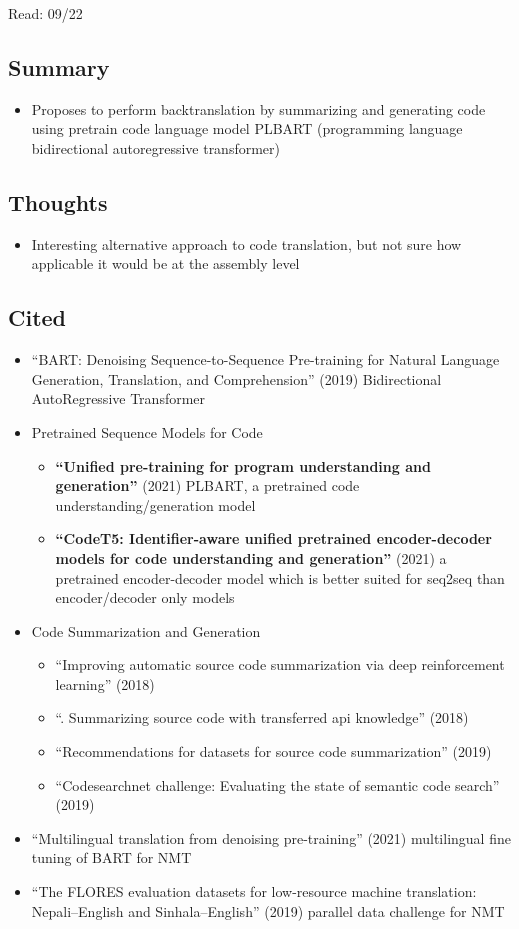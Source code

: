 \documentclass{article}
\begin{document}
\noindent Read: 09/22

\subsection*{Summary}
\begin{itemize}
	\item Proposes to perform backtranslation by summarizing and generating code using pretrain code language model PLBART (programming language bidirectional autoregressive transformer)
\end{itemize}

\subsection*{Thoughts}
\begin{itemize}
	\item Interesting alternative approach to code translation, but not sure how applicable it would be at the assembly level
\end{itemize}

\subsection*{Cited}
\begin{itemize}
	\item ``BART: Denoising Sequence-to-Sequence Pre-training for Natural Language Generation, Translation, and Comprehension'' (2019) Bidirectional AutoRegressive Transformer
	\item Pretrained Sequence Models for Code
	\begin{itemize}
		\item \textbf{``Unified pre-training for program understanding and generation''} (2021) PLBART, a pretrained code understanding/generation model
		\item \textbf{``CodeT5: Identifier-aware unified pretrained encoder-decoder models for code understanding and generation''} (2021) a pretrained encoder-decoder model which is better suited for seq2seq than encoder/decoder only models
	\end{itemize}
	\item Code Summarization and Generation
	\begin{itemize}
		\item ``Improving automatic source code summarization via deep reinforcement learning'' (2018)
		\item ``. Summarizing source code with transferred api knowledge'' (2018)
		\item ``Recommendations for datasets for source code summarization'' (2019)
		\item ``Codesearchnet challenge: Evaluating the state of semantic code search'' (2019)
	\end{itemize}
	\item ``Multilingual translation from denoising pre-training'' (2021) multilingual fine tuning of BART for NMT
	\item ``The FLORES evaluation datasets for low-resource machine translation: Nepali–English and Sinhala–English'' (2019) parallel data challenge for NMT
\end{itemize}
\end{document}
